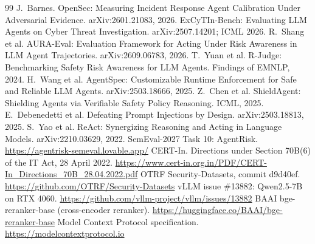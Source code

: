 \documentclass[11pt,a4paper]{article}
\begin{document}
\begingroup
\footnotesize
\renewcommand{\section}[2]{\vspace{4pt}\textbf{\large References}\par\vspace{2pt}}
\begin{thebibliography}{99}
\setlength{\itemsep}{0pt}
 J.~Barnes. OpenSec: Measuring Incident Response Agent Calibration Under Adversarial Evidence. arXiv:2601.21083, 2026.
 ExCyTIn-Bench: Evaluating LLM Agents on Cyber Threat Investigation. arXiv:2507.14201; ICML 2026.
 R.~Shang et al. AURA-Eval: Evaluation Framework for Acting Under Risk Awareness in LLM Agent Trajectories. arXiv:2609.06783, 2026.
 T.~Yuan et al. R-Judge: Benchmarking Safety Risk Awareness for LLM Agents. Findings of EMNLP, 2024.
 H.~Wang et al. AgentSpec: Customizable Runtime Enforcement for Safe and Reliable LLM Agents. arXiv:2503.18666, 2025.
 Z.~Chen et al. ShieldAgent: Shielding Agents via Verifiable Safety Policy Reasoning. ICML, 2025.
 E.~Debenedetti et al. Defeating Prompt Injections by Design. arXiv:2503.18813, 2025.
 S.~Yao et al. ReAct: Synergizing Reasoning and Acting in Language Models. arXiv:2210.03629, 2022.
 SemEval-2027 Task 10: AgentRisk. \url{https://agentrisk-semeval.lovable.app/}
 CERT-In. Directions under Section 70B(6) of the IT Act, 28 April 2022. \url{https://www.cert-in.org.in/PDF/CERT-In_Directions_70B_28.04.2022.pdf}
 OTRF Security-Datasets, commit d9d40ef. \url{https://github.com/OTRF/Security-Datasets}
 vLLM issue \#13882: Qwen2.5-7B on RTX 4060. \url{https://github.com/vllm-project/vllm/issues/13882}
 BAAI bge-reranker-base (cross-encoder reranker). \url{https://huggingface.co/BAAI/bge-reranker-base}
 Model Context Protocol specification. \url{https://modelcontextprotocol.io}
\end{thebibliography}
\endgroup
\end{document}

